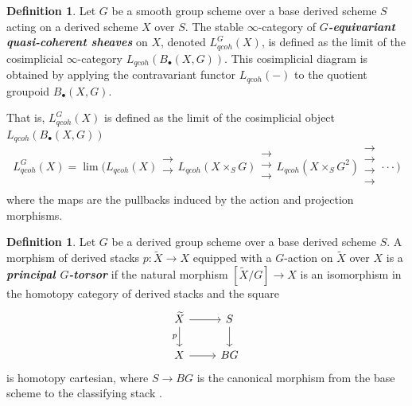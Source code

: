 \documentclass[reqno]{amsart}
\theoremstyle{definition}
\newtheorem{definition}[theorem]{Definition}
\theoremstyle{remark}
\newcommand{\bfem}[1]{\textbf{\textit{#1}}}
\begin{document}
\begin{definition}
  \label{def:equivariant_sheaves}
  Let $G$ be a smooth group scheme over a base derived scheme $S$ acting on a derived scheme $X$ over $S$. The stable $\infty$-category of \bfem{$G$-equivariant quasi-coherent sheaves} on $X$, denoted $L_{qcoh}^G(X)$, is defined as the limit of the cosimplicial $\infty$-category $L_{qcoh}(B_\bullet(X, G))$. This cosimplicial diagram is obtained by applying the contravariant functor $L_{qcoh}(-)$ to the quotient groupoid $B_\bullet(X, G)$.
\end{definition}
That is, $L_{qcoh}^G(X)$ is defined as the limit of the cosimplicial object $L_{qcoh}(B_\bullet(X, G))$
\begin{equation*}
    L_{qcoh}^G(X) = \lim \bigg(L_{qcoh}(X)\mathrel{\substack{\textstyle\rightarrow\\[-0.1ex]
            \textstyle\rightarrow \\[-0.1ex]}} L_{qcoh}(X \times_S G)
    \mathrel{\substack{\textstyle\rightarrow\\[-0.1ex]
            \textstyle\rightarrow \\[-0.1ex]
            \textstyle\rightarrow\\[-0.3ex]}} L_{qcoh}(X \times_S G^2)
    \mathrel{\substack{\textstyle\rightarrow\\[-0.1ex]
            \textstyle\rightarrow \\[-0.1ex]
            \textstyle\rightarrow \\[-0.1ex]
            \textstyle\rightarrow \\[-0.3ex]}} 
    \cdot\cdot\cdot \bigg)
\end{equation*}
where the maps are the pullbacks induced by the action and projection morphisms.

\begin{definition}
  \label{def:principal_torsor}
  Let $G$ be a derived group scheme over a base derived scheme $S$. A morphism of derived stacks $p \colon \widetilde{X} \to X$ equipped with a $G$-action on $\widetilde{X}$ over $X$ is a \bfem{principal $G$-torsor} if the natural morphism $[\widetilde{X}/G] \to X$ is an isomorphism in the homotopy category of derived stacks and the square
  \begin{equation*}
    \begin{tikzcd}
      \widetilde{X} \arrow[r] \arrow[d, "p"'] & S \arrow[d] \\
      X \arrow[r] & BG
    \end{tikzcd}
  \end{equation*}
  is homotopy cartesian, where $S \to BG$ is the canonical morphism from the base scheme to the classifying stack \cite[Definition 1.3.5.2]{TV2}.
\end{definition}
\end{document}
